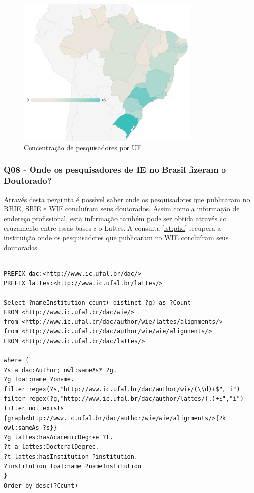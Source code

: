 \begin{figure}[!ht]
	\centering
	\includegraphics[width=0.8\textwidth]{./imagens/where.pdf}
	\caption{Concentração de pesquisadores por UF}
	\label{fig:where}
\end{figure}

\subsubsection{Q08 - Onde os pesquisadores de IE no Brasil fizeram o Doutorado?}
Através desta pergunta é possível saber onde os pesquisadores que publicaram no RBIE, SBIE e WIE concluíram seus doutorados. Assim como a informação de endereço profissional, esta informação também pode ser obtida através do cruzamento entre essas bases e o Lattes. A consulta \ref{lst:phd} recupera a instituição onde os pesquisadores que publicaram no WIE concluíram seus doutorados.

\begin{lstlisting}[captionpos=b, caption= Consulta para recuperar a concentração de doutorados por universidade, label=lst:phd,
basicstyle=\ttfamily,frame=single]

PREFIX dac:<http://www.ic.ufal.br/dac/>
PREFIX lattes:<http://www.ic.ufal.br/lattes/>

Select ?nameInstitution count( distinct ?g) as ?Count
FROM <http://www.ic.ufal.br/dac/wie/>
from <http://www.ic.ufal.br/dac/author/wie/lattes/alignments/>
from <http://www.ic.ufal.br/dac/author/wie/wie/alignments/>
FROM <http://www.ic.ufal.br/dac/lattes/>

where {
?s a dac:Author; owl:sameAs* ?g.
?g foaf:name ?oname.
filter regex(?s,"http://www.ic.ufal.br/dac/author/wie/(\\d)+$","i")
filter regex(?g,"http://www.ic.ufal.br/dac/author/lattes/(.)+$","i")
filter not exists {graph<http://www.ic.ufal.br/dac/author/wie/wie/alignments/>{?k owl:sameAs ?s}}
?g lattes:hasAcademicDegree ?t.
?t a lattes:DoctoralDegree.
?t lattes:hasInstitution ?institution.
?institution foaf:name ?nameInstitution
}
Order by desc(?Count)
\end{lstlisting}


